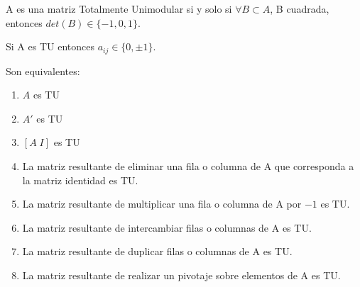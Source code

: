 \documentclass[PM.tex]{subfiles}
\begin{document}
\begin{defi}
A es una matriz Totalmente Unimodular si y solo si $\forall B\subset A$, B cuadrada, entonces $det(B)\in\{-1,0,1\}$. 
\end{defi}
\begin{nota}
Si A es TU entonces $a_{ij}\in\{0,\pm1\}$.
\end{nota}
\begin{theorem}
Son equivalentes:
\begin{enumerate}
\item $A$ es TU
\item $A'$ es TU
\item $[A\;I]$ es TU
\item La matriz resultante de eliminar una fila o columna de A que corresponda a la matriz identidad es TU.
\item La matriz resultante de multiplicar una fila o columna de A por $-1$ es TU.
\item La matriz resultante de intercambiar filas o columnas de A es TU.
\item La matriz resultante de duplicar filas o columnas de A es TU.
\item La matriz resultante de realizar un pivotaje sobre elementos de A es TU.
\end{enumerate}
\end{theorem}
\end{document}
